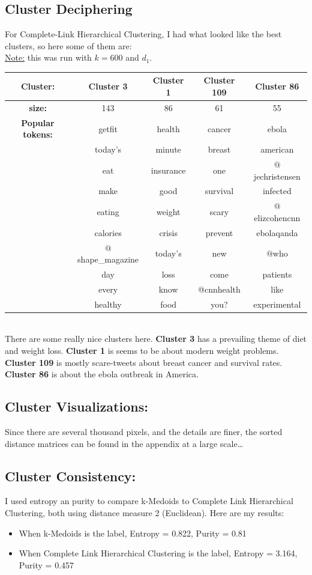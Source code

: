 \documentclass[fleqn]{article}
\begin{document}
\subsection*{Cluster Deciphering}
For Complete-Link Hierarchical Clustering, I had what looked like the best clusters, so here some of them are:\\
\underline{Note:} this was run with $k=600$ and $d_1$.\\
\newline
\begin{tabular}{|c|c|c|c|c|}
    \hline
    \textbf{Cluster:} &\textbf{Cluster 3}& \textbf{Cluster 1}&\textbf{Cluster 109}&\textbf{Cluster 86}\\
    \hline
    \textbf{size:}& 143 & 86 & 61&55\\
    \hline
    \textbf{Popular tokens:}& getfit& health&cancer&ebola\\
    &today's&minute&breast&american\\
    &eat&insurance&one&$@$jechristensen\\
    &make&good&survival&infected\\
    &eating&weight&scary&$@$elizcohencnn\\
    &calories&crisis&prevent &ebolaqanda\\
    &$@$shape\_magazine&today's&new& $@$who\\
    &day&loss&come &patients\\
    &every&know&@cnnhealth &like \\
    &healthy&food&you?&experimental\\
    \hline
\end{tabular}\\
\newline
There are some really nice clusters here. \textbf{Cluster 3} has a prevailing theme of diet and weight loss.  \textbf{Cluster 1} is seems to be about modern weight problems. \textbf{Cluster 109} is mostly scare-tweets about breast cancer and survival rates.  \textbf{Cluster 86} is about the ebola outbreak in America.
\subsection{Cluster Visualizations:}
Since there are several thousand pixels, and the details are finer, the sorted distance matrices can be found in the appendix at a large scale\dots
\subsection{Cluster Consistency:}
I used entropy an purity to compare k-Medoids to Complete Link Hierarchical Clustering, both using distance measure 2 (Euclidean).  Here are my results:
\begin{itemize}
    \item When k-Medoids is the label, Entropy = 0.822, Purity = 0.81
    \item When Complete Link Hierarchical Clustering is the label, Entropy = 3.164, Purity = 0.457
\end{itemize}
\end{document}
